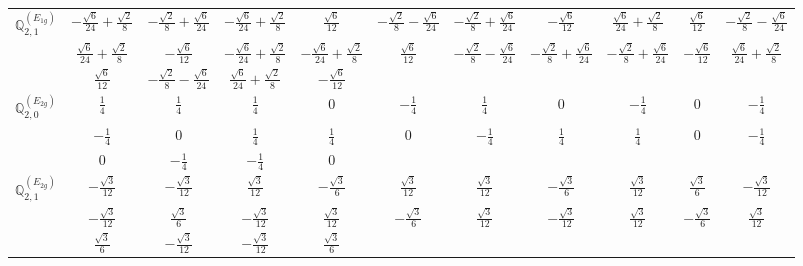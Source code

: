 \documentclass[fleqn,10pt,landscape]{article}
\begin{document}
\begin{itemize}
{\begin{center}
\begin{longtable}{ccccccccccc}
$\mathbb{Q}_{2,1}^{(E_{1g})}$ & $ - \frac{\sqrt{6}}{24} + \frac{\sqrt{2}}{8} $ & $ - \frac{\sqrt{2}}{8} + \frac{\sqrt{6}}{24} $ & $ - \frac{\sqrt{6}}{24} + \frac{\sqrt{2}}{8} $ & $ \frac{\sqrt{6}}{12} $ & $ - \frac{\sqrt{2}}{8} - \frac{\sqrt{6}}{24} $ & $ - \frac{\sqrt{2}}{8} + \frac{\sqrt{6}}{24} $ & $ - \frac{\sqrt{6}}{12} $ & $ \frac{\sqrt{6}}{24} + \frac{\sqrt{2}}{8} $ & $ \frac{\sqrt{6}}{12} $ & $ - \frac{\sqrt{2}}{8} - \frac{\sqrt{6}}{24} $ \\
& $ \frac{\sqrt{6}}{24} + \frac{\sqrt{2}}{8} $ & $ - \frac{\sqrt{6}}{12} $ & $ - \frac{\sqrt{6}}{24} + \frac{\sqrt{2}}{8} $ & $ - \frac{\sqrt{6}}{24} + \frac{\sqrt{2}}{8} $ & $ \frac{\sqrt{6}}{12} $ & $ - \frac{\sqrt{2}}{8} - \frac{\sqrt{6}}{24} $ & $ - \frac{\sqrt{2}}{8} + \frac{\sqrt{6}}{24} $ & $ - \frac{\sqrt{2}}{8} + \frac{\sqrt{6}}{24} $ & $ - \frac{\sqrt{6}}{12} $ & $ \frac{\sqrt{6}}{24} + \frac{\sqrt{2}}{8} $ \\
& $ \frac{\sqrt{6}}{12} $ & $ - \frac{\sqrt{2}}{8} - \frac{\sqrt{6}}{24} $ & $ \frac{\sqrt{6}}{24} + \frac{\sqrt{2}}{8} $ & $ - \frac{\sqrt{6}}{12} $ & $  $ & $  $ & $  $ & $  $ & $  $ & $  $ \\ \hline
$\mathbb{Q}_{2,0}^{(E_{2g})}$ & $ \frac{1}{4} $ & $ \frac{1}{4} $ & $ \frac{1}{4} $ & $ 0 $ & $ - \frac{1}{4} $ & $ \frac{1}{4} $ & $ 0 $ & $ - \frac{1}{4} $ & $ 0 $ & $ - \frac{1}{4} $ \\
& $ - \frac{1}{4} $ & $ 0 $ & $ \frac{1}{4} $ & $ \frac{1}{4} $ & $ 0 $ & $ - \frac{1}{4} $ & $ \frac{1}{4} $ & $ \frac{1}{4} $ & $ 0 $ & $ - \frac{1}{4} $ \\
& $ 0 $ & $ - \frac{1}{4} $ & $ - \frac{1}{4} $ & $ 0 $ & $  $ & $  $ & $  $ & $  $ & $  $ & $  $ \\ \hline
$\mathbb{Q}_{2,1}^{(E_{2g})}$ & $ - \frac{\sqrt{3}}{12} $ & $ - \frac{\sqrt{3}}{12} $ & $ \frac{\sqrt{3}}{12} $ & $ - \frac{\sqrt{3}}{6} $ & $ \frac{\sqrt{3}}{12} $ & $ \frac{\sqrt{3}}{12} $ & $ - \frac{\sqrt{3}}{6} $ & $ \frac{\sqrt{3}}{12} $ & $ \frac{\sqrt{3}}{6} $ & $ - \frac{\sqrt{3}}{12} $ \\
& $ - \frac{\sqrt{3}}{12} $ & $ \frac{\sqrt{3}}{6} $ & $ - \frac{\sqrt{3}}{12} $ & $ \frac{\sqrt{3}}{12} $ & $ - \frac{\sqrt{3}}{6} $ & $ \frac{\sqrt{3}}{12} $ & $ - \frac{\sqrt{3}}{12} $ & $ \frac{\sqrt{3}}{12} $ & $ - \frac{\sqrt{3}}{6} $ & $ \frac{\sqrt{3}}{12} $ \\
& $ \frac{\sqrt{3}}{6} $ & $ - \frac{\sqrt{3}}{12} $ & $ - \frac{\sqrt{3}}{12} $ & $ \frac{\sqrt{3}}{6} $ & $  $ & $  $ & $  $ & $  $ & $  $ & $  $ \\ \hline

\end{longtable}
\end{center}}
\end{itemize}
\end{document}
